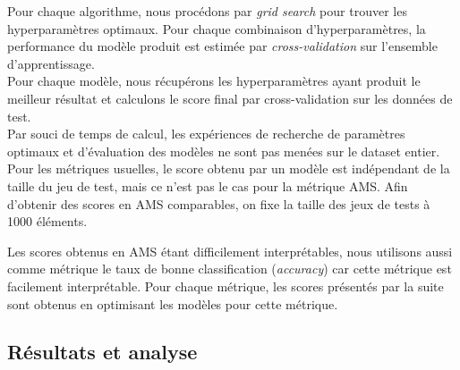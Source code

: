 \documentclass[12pt]{article}
\begin{document}
Pour chaque algorithme, nous procédons par \emph{grid search} pour trouver les
hyperparamètres optimaux. Pour chaque combinaison d'hyperparamètres, la
performance du modèle produit est estimée par \emph{cross-validation} sur
l'ensemble d'apprentissage. \\

Pour chaque modèle, nous récupérons les hyperparamètres ayant produit le meilleur résultat et
calculons le score final par cross-validation sur les données de test. \\

Par souci de temps de calcul, les expériences de recherche de paramètres optimaux
et d'évaluation des modèles ne sont pas menées sur le dataset entier.
Pour les métriques usuelles, le score obtenu par un modèle est indépendant de
la taille du jeu de test, mais ce n'est pas le cas pour la métrique AMS.
Afin d'obtenir des scores en AMS comparables,
on fixe la taille des jeux de tests à 1000 éléments.

Les scores obtenus en AMS étant difficilement interprétables, nous utilisons aussi comme métrique
le taux de bonne classification (\emph{accuracy}) car cette métrique est facilement interprétable.
Pour chaque métrique, les scores présentés par la suite sont obtenus en optimisant les modèles
pour cette métrique.

\subsection{Résultats et analyse}

\begin{table}[H]
\centering
{}
\caption{Paramètres optimaux pour le SVM (accuracy, $|X_{train}|=1000$)}
\end{table}


\begin{table}[H]
    \caption{Paramètres optimaux pour les méthodes d'ensemble (accuracy,
    $|X_{train}|=1000$)}
\end{table}
\end{document}
